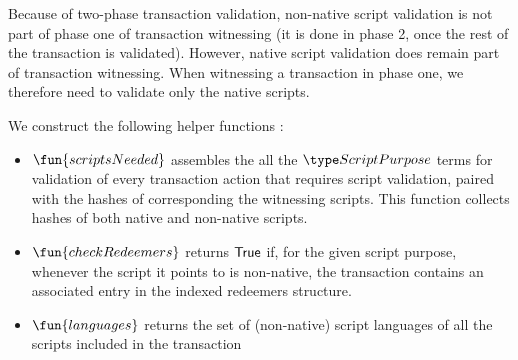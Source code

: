 Because of two-phase transaction validation, non-native script validation is not part of phase one of transaction witnessing
(it is done in phase 2, once the rest of the transaction is validated).
However, native script validation does remain part of transaction witnessing.
When witnessing a transaction in phase one, we therefore need to validate only the native scripts.

We construct the following helper functions :

\begin{itemize}
  \item $\fun{scriptsNeeded}$ assembles the all the $\ScriptPurpose$ terms
  for validation of every transaction action that requires script validation,
  paired with the hashes of corresponding the witnessing scripts.
  This function collects hashes of both native and non-native scripts.

  \item $\fun{checkRedeemers}$ returns $\mathsf{True}$ if, for the given script purpose,
  whenever the script it points to is non-native, the transaction contains an associated entry
  in the indexed redeemers structure.

  \item $\fun{languages}$ returns the set of (non-native) script languages
  of all the scripts included in the transaction
\end{itemize}

